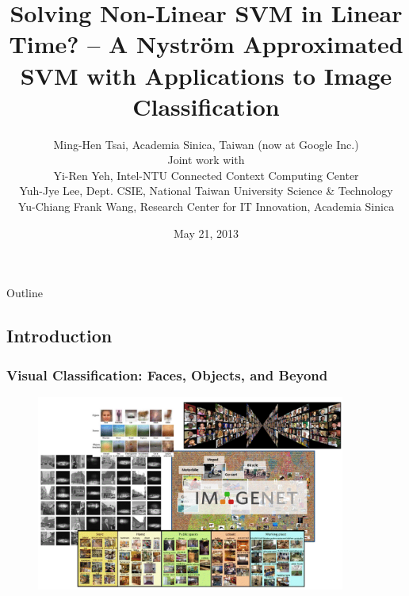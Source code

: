\documentclass{beamer}
\begin{document}
\section{ }
\title[Nystr\"om Decomposition]{Solving Non-Linear SVM in Linear Time? -- A Nystr\"om Approximated SVM with Applications to Image Classification}
\author[Ming-Hen Tsai]{
{\scriptsize
Ming-Hen Tsai, Academia Sinica, Taiwan (now at Google Inc.)\\
Joint work with \\
Yi-Ren Yeh, Intel-NTU Connected Context Computing Center \\
Yuh-Jye Lee, Dept. CSIE, National Taiwan University Science \& Technology\\
Yu-Chiang Frank Wang, Research Center for IT Innovation, Academia Sinica\\
}
}
\date{May 21, 2013}




\begin{frame}
\titlepage
\end{frame}

\begin{frame}{Outline}
\tableofcontents[pausesections]
\end{frame}

\subsection{Introduction}

\begin{frame}
  \frametitle{Visual Classification: Faces, Objects, and Beyond}
  \begin{figure}
  \includegraphics[width=4in]{tasks_illus.png}\\
  \end{figure}
\end{frame}
\end{document}
